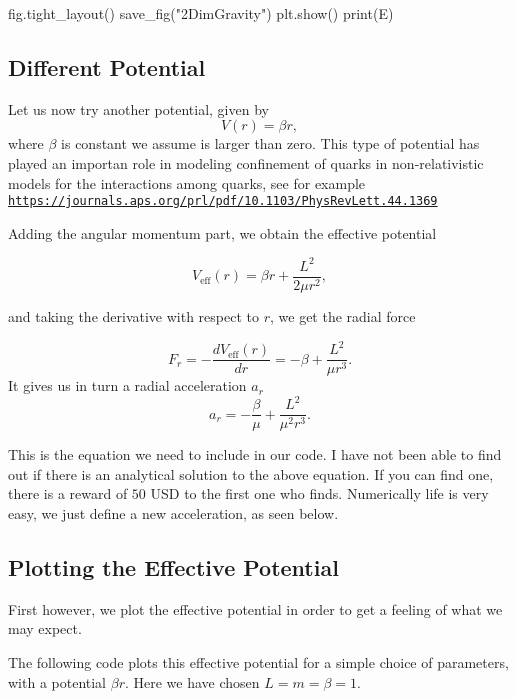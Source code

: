 \documentclass[%
oneside,                 %
final,                   %
10pt]{article}
\begin{document}
fig.tight_layout()
save_fig("2DimGravity")
plt.show()
print(E)


\epycod


\subsection{Different Potential}

Let us now try another potential, given by
\[
V(r) = \beta r,
\]
where $\beta$ is constant we assume is larger than zero. This type of potential has played an importan role in modeling confinement of quarks in non-relativistic models for the interactions among quarks, see for example \href{{https://journals.aps.org/prl/pdf/10.1103/PhysRevLett.44.1369}}{\nolinkurl{https://journals.aps.org/prl/pdf/10.1103/PhysRevLett.44.1369}} 

Adding the angular momentum part, we obtain the effective potential

\[
V_{\mathrm{eff}}(r) = \beta r+\frac{L^2}{2\mu r^2},
\]

and taking the derivative with respect to $r$, we get the radial force

\[
F_r=-\frac{dV_{\mathrm{eff}}(r)}{dr} = -\beta+\frac{L^2}{\mu r^3}.
\]
It gives us in turn a radial acceleration $a_r$
\[
a_r= -\frac{\beta}{\mu}+\frac{L^2}{\mu^2 r^3}.
\]

This is the equation we need to include in our code. I have not been able to find out if there is an analytical solution to the above equation. If you can find one, there is a reward of $50$ USD to the first one who finds. Numerically life is very easy, we just define a new acceleration, as seen below.

\subsection{Plotting the Effective Potential}

First however, we plot the effective potential in order to get a feeling of what we may expect.

The following code plots this effective potential for a simple choice of parameters, with a potential $\beta r $. Here we have chosen $L=m=\beta=1$. 
\end{document}
